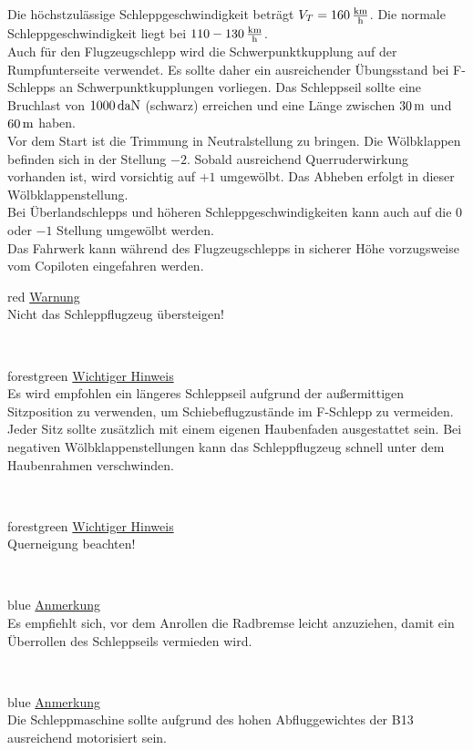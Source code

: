 Die höchstzulässige Schleppgeschwindigkeit beträgt $V_T=\unit[160]{\frac{km}{h}}$. Die normale Schleppgeschwindigkeit liegt bei $\unit[110-130]{\frac{km}{h}}$. \\
Auch für den Flugzeugschlepp wird die Schwerpunktkupplung auf der Rumpfunterseite verwendet. Es sollte daher ein ausreichender Übungsstand bei F-Schlepps an Schwerpunktkupplungen vorliegen. Das Schleppseil sollte eine Bruchlast von $\unit[1000]{daN}$ (schwarz) erreichen und eine Länge zwischen $\unit[30]{m}$ und $\unit[60]{m}$ haben.\\
Vor dem Start ist die Trimmung in Neutralstellung zu bringen. Die Wölbklappen befinden sich in der Stellung $-2$. Sobald ausreichend Querruderwirkung vorhanden ist, wird vorsichtig auf $+1$ umgewölbt. Das Abheben erfolgt in dieser Wölbklappenstellung. \\
Bei Überlandschlepps und höheren Schleppgeschwindigkeiten kann auch auf die $0$ oder  $-1$ Stellung umgewölbt werden.\\
Das Fahrwerk kann während des Flugzeugschlepps in sicherer Höhe vorzugsweise vom Copiloten eingefahren werden.\\
\newline
\begin{color}{red}
\large{\underline{Warnung}}\\
Nicht das Schleppflugzeug übersteigen!
\end{color}\\
\newline
\begin{color}{forestgreen}
\large{\underline{Wichtiger Hinweis}}\\
Es wird empfohlen ein längeres Schleppseil aufgrund der außermittigen Sitzposition zu verwenden, um Schiebeflugzustände im F-Schlepp zu 	vermeiden. Jeder Sitz sollte zusätzlich mit einem eigenen Haubenfaden ausgestattet sein. Bei negativen Wölbklappenstellungen kann das Schleppflugzeug schnell unter dem Haubenrahmen verschwinden.
\end{color}\\
\newline
\begin{color}{forestgreen}
\large{\underline{Wichtiger Hinweis}}\\
Querneigung beachten!
\end{color}\\
\newline
\begin{color}{blue}
\large{\underline{Anmerkung}}\\
Es empfiehlt sich, vor dem Anrollen die Radbremse leicht anzuziehen, damit ein	Überrollen des Schleppseils vermieden wird. 
\end{color}\\
\newline
\begin{color}{blue}
\large{\underline{Anmerkung}}\\
Die Schleppmaschine sollte aufgrund des hohen Abfluggewichtes der B13 ausreichend motorisiert sein.
\end{color}\\

